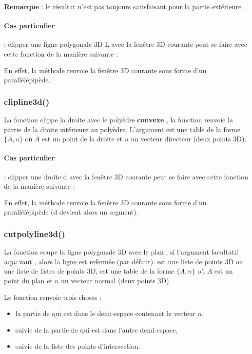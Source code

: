 \textbf{Remarque} : le résultat n'est pas toujours satisfaisant pour la partie extérieure.

\paragraph{Cas particulier} : clipper une ligne polygonale 3D \argu L avec la fenêtre 3D courante peut se faire avec cette fonction de la manière suivante :

En effet, la méthode  renvoie la fenêtre 3D courante sous forme d'un parallélépipède.


\subsubsection{clipline3d()}

La fonction  clippe la droite  avec le polyèdre \textbf{convexe} , la fonction renvoie la partie de la droite intérieure au polyèdre. L'argument  est une table de la forme $\{A,u\}$ où $A$ est un point de la droite et $u$ un vecteur directeur (deux points 3D).

\paragraph{Cas particulier} : clipper une droite \argu d avec la fenêtre 3D courante peut se faire avec cette fonction de la manière suivante :

En effet, la méthode  renvoie la fenêtre 3D courante sous forme d'un parallélépipède (\argu d devient alors un segment).

\subsubsection{cutpolyline3d()}

La fonction  coupe la ligne polygonale 3D  avec le plan , si l'argument facultatif \emph{argu} vaut \true, alors la ligne est refermée (\false par défaut).  est une liste de points 3D ou une liste de listes de points 3D,  est une table de la forme $\{A,n\}$ où $A$ est un point du plan et $n$ un vecteur normal (deux points 3D).

Le fonction renvoie trois choses :
\begin{itemize}
    \item la partie de  qui est dans le demi-espace contenant le vecteur $n$,
    \item suivie de la partie de  qui est dans l'autre demi-espace,
    \item suivie de la liste des points d'intersection.
\end{itemize}

